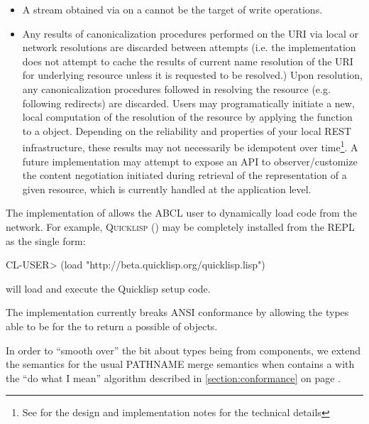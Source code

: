\documentclass[10pt]{book}
\begin{document}
\begin{itemize}

\item A stream obtained via  on a 
  cannot be the target of write operations.

\item Any results of canonicalization procedures performed on the
  \textsc{URI} via local or network resolutions are discarded between
  attempts (i.e. the implementation does not attempt to cache the
  results of current name resolution of the URI for underlying
  resource unless it is requested to be resolved.)  Upon resolution,
  any canonicalization procedures followed in resolving the resource
  (e.g. following redirects) are discarded.  Users may programatically
  initiate a new, local computation of the resolution of the resource
  by applying the  function to a
   object.  Depending on the reliability and
  properties of your local \textsc{REST} infrastructure, these results
  may not necessarily be idempotent over time\footnote {See
    \cite{uri-pathname} for the design and implementation notes for
    the technical details}.  A future implementation may attempt to
  expose an API to observer/customize the content negotiation
  initiated during retrieval of the representation of a given
  resource, which is currently handled at the application level.

\end{itemize}

The implementation of  allows the \textsc{ABCL}
user to dynamically load code from the network.  For example,
\textsc{Quicklisp} (\cite{quicklisp}) may be completely installed from
the \textsc{REPL} as the single form:

\begin{listing-lisp}
  CL-USER> (load "http://beta.quicklisp.org/quicklisp.lisp")
\end{listing-lisp}

will load and execute the Quicklisp setup code.

The implementation currently breaks \textsc{ANSI} conformance by allowing the
types able to be  for the  to return a possible  of
 objects.  %

In order to ``smooth over'' the bit about types being 
from  components, we extend the semantics for the
usual PATHNAME merge semantics when 
contains a  with the ``do what I mean''
algorithm described in \ref{section:conformance} on page
\pageref{section:conformance}.
\end{document}
